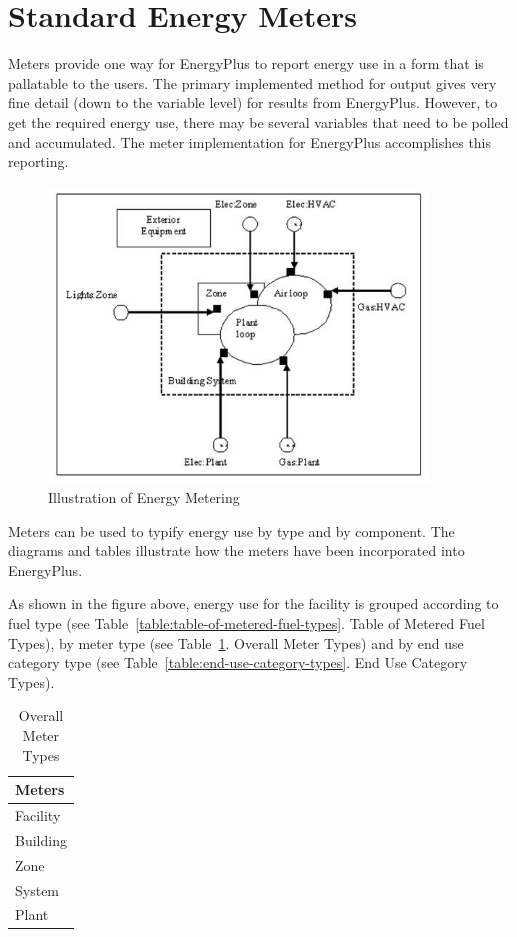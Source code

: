 \section{Standard Energy Meters}\label{standard-energy-meters}

Meters provide one way for EnergyPlus to report energy use in a form that is pallatable to the users. The primary implemented method for output gives very fine detail (down to the variable level) for results from EnergyPlus. However, to get the required energy use, there may be several variables that need to be polled and accumulated. The meter implementation for EnergyPlus accomplishes this reporting.

\begin{figure}[hbtp] %
\centering
\includegraphics[width=0.9\textwidth, height=0.9\textheight, keepaspectratio=true]{media/image024.jpg}
\caption{Illustration of Energy Metering \protect \label{fig:illustration-of-energy-metering}}
\end{figure}

Meters can be used to typify energy use by type and by component. The diagrams and tables illustrate how the meters have been incorporated into EnergyPlus.

As shown in the figure above, energy use for the facility is grouped according to fuel type (see Table~\ref{table:table-of-metered-fuel-types}. Table of Metered Fuel Types), by meter type (see Table~\ref{table:overall-meter-types}. Overall Meter Types) and by end use category type (see Table~\ref{table:end-use-category-types}. End Use Category Types).

\begin{longtable}[c]{@{}l@{}}
\caption{Overall Meter Types \protect \label{table:overall-meter-types}}\\
\toprule 
Meters \tabularnewline \midrule
\endhead
Facility \tabularnewline
Building \tabularnewline
Zone \tabularnewline
System \tabularnewline
Plant \tabularnewline
\bottomrule
\end{longtable}

